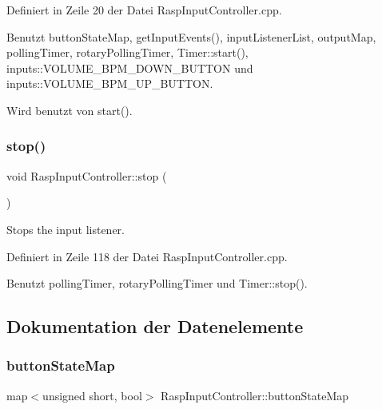 Definiert in Zeile 20 der Datei Rasp\+Input\+Controller.\+cpp.



Benutzt button\+State\+Map, get\+Input\+Events(), input\+Listener\+List, output\+Map, polling\+Timer, rotary\+Polling\+Timer, Timer\+::start(), inputs\+::\+V\+O\+L\+U\+M\+E\+\_\+\+B\+P\+M\+\_\+\+D\+O\+W\+N\+\_\+\+B\+U\+T\+T\+ON und inputs\+::\+V\+O\+L\+U\+M\+E\+\_\+\+B\+P\+M\+\_\+\+U\+P\+\_\+\+B\+U\+T\+T\+ON.



Wird benutzt von start().

\mbox{\label{class_rasp_input_controller_a7d9523be1a83acde964cb5d2b1d281ed}} 
\subsubsection{\texorpdfstring{stop()}{stop()}}
{\footnotesize\ttfamily void Rasp\+Input\+Controller\+::stop (\begin{DoxyParamCaption}{ }\end{DoxyParamCaption})}

Stops the input listener. 

Definiert in Zeile 118 der Datei Rasp\+Input\+Controller.\+cpp.



Benutzt polling\+Timer, rotary\+Polling\+Timer und Timer\+::stop().



\subsection{Dokumentation der Datenelemente}
\mbox{\label{class_rasp_input_controller_ae02dcbb81abe6b6e6e3eaaeef4f3bf4a}} 
\subsubsection{\texorpdfstring{button\+State\+Map}{buttonStateMap}}
{\footnotesize\ttfamily map$<$unsigned short, bool$>$ Rasp\+Input\+Controller\+::button\+State\+Map\hspace{0.3cm}{\ttfamily [private]}}

